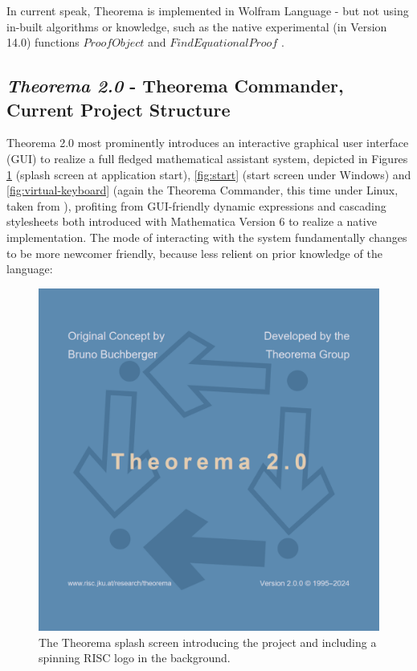 In current speak, Theorema is implemented in Wolfram Language - but not using in-built algorithms or knowledge, such as the native experimental (in Version 14.0) functions \( ProofObject \) \cite{noauthor_proofobjectwolfram_nodate} and \( FindEquationalProof \) \cite{noauthor_findequationalproofwolfram_nodate}.

\subsection{\textit{Theorema 2.0} - Theorema Commander, Current Project Structure}

Theorema 2.0 most prominently introduces an interactive graphical user interface (GUI) to realize a full fledged mathematical assistant system, depicted in Figures \ref{fig:splash} (splash screen at application start), \ref{fig:start} (start screen under Windows) and \ref{fig:virtual-keyboard} (again the Theorema Commander, this time under Linux, taken from \cite{windsteiger_theorema_2013}), profiting from GUI-friendly dynamic expressions \cite[p. 76]{noauthor_introduction_nodate} and cascading stylesheets \cite{noauthor_stylesheetswolfram_nodate} both introduced with Mathematica Version 6 to realize a native implementation. The mode of interacting with the system fundamentally changes to be more newcomer friendly, because less relient on prior knowledge of the language:

\begin{figure}[h]
    \centering
    \includegraphics[scale=0.5]{images/theory/splash.png}
    \caption{The Theorema splash screen introducing the project and including a spinning RISC logo in the background.}
    \label{fig:splash}
\end{figure}

